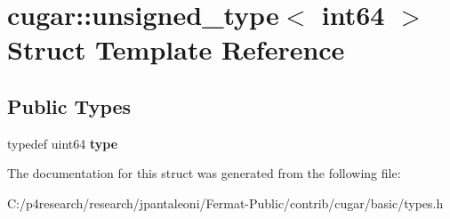 \hypertarget{structcugar_1_1unsigned__type_3_01int64_01_4}{}\section{cugar\+:\+:unsigned\+\_\+type$<$ int64 $>$ Struct Template Reference}
\label{structcugar_1_1unsigned__type_3_01int64_01_4}
\subsection*{Public Types}
\begin{DoxyCompactItemize}
\item 
\mbox{\label{structcugar_1_1unsigned__type_3_01int64_01_4_a217b1ce64aeb9881e2d2b7b6f32c8c0e}} 
typedef uint64 {\bfseries type}
\end{DoxyCompactItemize}


The documentation for this struct was generated from the following file\+:\begin{DoxyCompactItemize}
\item 
C\+:/p4research/research/jpantaleoni/\+Fermat-\/\+Public/contrib/cugar/basic/types.\+h\end{DoxyCompactItemize}
